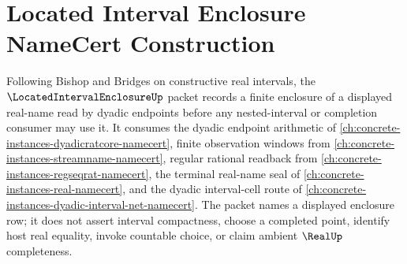\chapter{Located Interval Enclosure NameCert Construction}
\label{ch:concrete-instances-located-interval-enclosure-namecert}

Following Bishop and Bridges on constructive real intervals, the $\LocatedIntervalEnclosureUp$ packet records a finite enclosure of a displayed real-name read by dyadic endpoints before any nested-interval or completion consumer may use it. It consumes the dyadic endpoint arithmetic of \autoref{ch:concrete-instances-dyadicratcore-namecert}, finite observation windows from \autoref{ch:concrete-instances-streamname-namecert}, regular rational readback from \autoref{ch:concrete-instances-regseqrat-namecert}, the terminal real-name seal of \autoref{ch:concrete-instances-real-namecert}, and the dyadic interval-cell route of \autoref{ch:concrete-instances-dyadic-interval-net-namecert}. The packet names a displayed enclosure row; it does not assert interval compactness, choose a completed point, identify host real equality, invoke countable choice, or claim ambient $\RealUp$ completeness.

